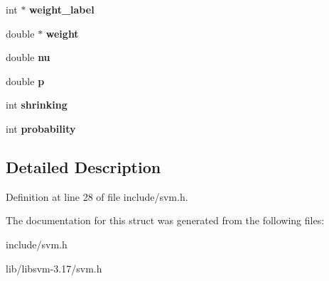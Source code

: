 \begin{DoxyCompactItemize}
\item 
\hypertarget{structsvm__parameter_ae08b79e163e9990275fb8e2f5ccfba9f}{
int $\ast$ {\bfseries weight\_\-label}}
\label{structsvm__parameter_ae08b79e163e9990275fb8e2f5ccfba9f}

\item 
\hypertarget{structsvm__parameter_a9a968a7c7412151a866a38bdd980b85f}{
double $\ast$ {\bfseries weight}}
\label{structsvm__parameter_a9a968a7c7412151a866a38bdd980b85f}

\item 
\hypertarget{structsvm__parameter_a4c20c566cb61d5808e8cabd7adbc35c1}{
double {\bfseries nu}}
\label{structsvm__parameter_a4c20c566cb61d5808e8cabd7adbc35c1}

\item 
\hypertarget{structsvm__parameter_a3b60d7ce96137a64caca81095d1a188b}{
double {\bfseries p}}
\label{structsvm__parameter_a3b60d7ce96137a64caca81095d1a188b}

\item 
\hypertarget{structsvm__parameter_afdbccdf6a24be650d75804b783edc347}{
int {\bfseries shrinking}}
\label{structsvm__parameter_afdbccdf6a24be650d75804b783edc347}

\item 
\hypertarget{structsvm__parameter_afac0ef02879d7e27e17ac2a75115a7d9}{
int {\bfseries probability}}
\label{structsvm__parameter_afac0ef02879d7e27e17ac2a75115a7d9}

\end{DoxyCompactItemize}


\subsection{Detailed Description}


Definition at line 28 of file include/svm.h.



The documentation for this struct was generated from the following files:\begin{DoxyCompactItemize}
\item 
include/svm.h\item 
lib/libsvm-\/3.17/svm.h\end{DoxyCompactItemize}
